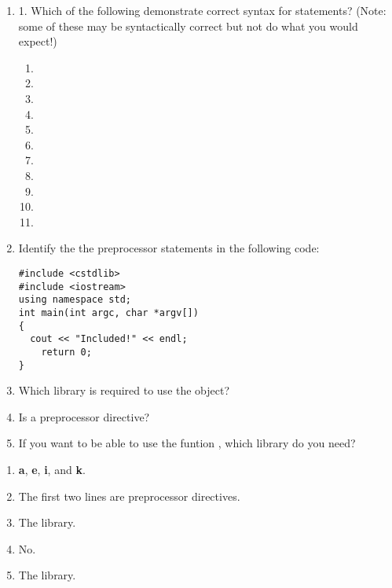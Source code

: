 \begin{enumerate}
	\item 1. Which of the following demonstrate correct syntax for  statements? (Note: some of these may be syntactically correct but not do what you would expect!)
	
	\begin{enumerate}
		\item {}
		\item {}
		\item {}
		\item {}
		\item {}
		\item {}
		\item {}
		\item {}
		\item {}
		\item {}
		\item {}
	\end{enumerate}
 
	\item Identify the the preprocessor statements in the following code: \nopagebreak[4]

\noindent\begin{minipage}{\linewidth}\begin{lstlisting}
#include <cstdlib>
#include <iostream>
using namespace std;
int main(int argc, char *argv[])
{
  cout << "Included!" << endl;
	return 0;
}
\end{lstlisting}\end{minipage}

  \item Which library is required to use the  object?
 
	\item Is  a preprocessor directive?
 
	\item If you want to be able to use the funtion , which library do you need?

\end{enumerate}


\begin{enumerate}
	\item \textbf{a}, \textbf{e}, \textbf{i}, and \textbf{k}.
	\item The first two lines are preprocessor directives.
	\item The  library.
	\item No.
	\item The  library.
\end{enumerate}





